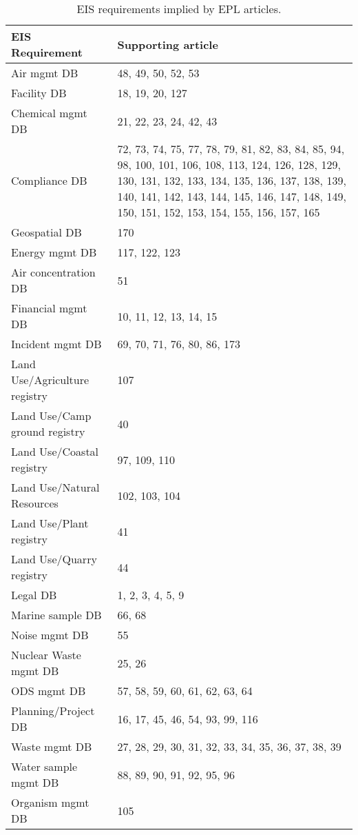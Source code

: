 \begin{table}[H]
\centering
\caption{EIS requirements implied by EPL articles.}
\label{tab:eisrqmt}
\begin{tabular}{@{}p{6cm}p{6cm}@{}}
\toprule
\textbf{EIS Requirement} & \textbf{Supporting article} \\ \midrule
Air mgmt DB & 48, 49, 50, 52, 53 \\
Facility DB & 18, 19, 20, 127 \\
Chemical mgmt DB & 21, 22, 23, 24, 42, 43 \\
Compliance DB & 72, 73, 74, 75, 77, 78, 79, 81, 82, 83, 84, 85, 94, 98, 100, 101, 106, 108, 113, 124, 126, 128, 129, 130, 131, 132, 133, 134, 135, 136, 137, 138, 139, 140, 141, 142, 143, 144, 145, 146, 147, 148, 149, 150, 151, 152, 153, 154, 155, 156, 157, 165 \\
Geospatial DB & 170 \\
Energy mgmt DB & 117, 122, 123 \\
Air concentration DB & 51 \\
Financial mgmt DB & 10, 11, 12, 13, 14, 15 \\
Incident mgmt DB & 69, 70, 71, 76, 80, 86, 173 \\
Land Use/Agriculture registry & 107 \\
Land Use/Camp ground registry & 40 \\
Land Use/Coastal registry & 97, 109, 110 \\
Land Use/Natural Resources & 102, 103, 104 \\
Land Use/Plant registry & 41 \\
Land Use/Quarry registry & 44 \\
Legal DB & 1, 2, 3, 4, 5, 9 \\
Marine sample DB & 66, 68 \\
Noise mgmt DB & 55 \\
Nuclear Waste mgmt DB & 25, 26 \\
ODS mgmt DB & 57, 58, 59, 60, 61, 62, 63, 64 \\
Planning/Project DB & 16, 17, 45, 46, 54, 93, 99, 116 \\
Waste mgmt DB & 27, 28, 29, 30, 31, 32, 33, 34, 35, 36, 37, 38, 39 \\
Water sample mgmt DB & 88, 89, 90, 91, 92, 95, 96 \\
Organism mgmt DB & 105 \\ \bottomrule
\end{tabular}
\end{table}

